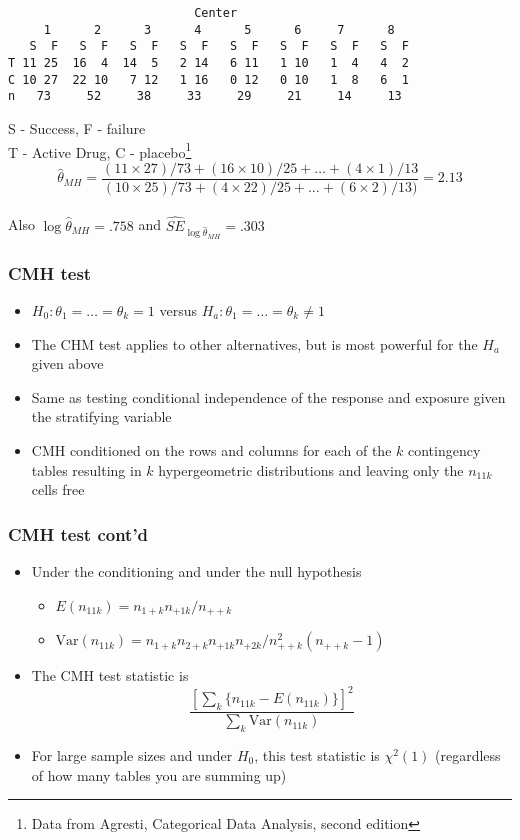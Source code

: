 \documentclass[aspectratio=169]{beamer}
\newcommand{\Var}{\mathrm{Var}}
\begin{document}
\begin{frame}[fragile]
\ttfamily\small
\begin{verbatim}
                          Center
     1      2      3      4      5      6     7      8
   S  F   S  F   S  F   S  F   S  F   S  F   S  F   S  F
T 11 25  16  4  14  5   2 14   6 11   1 10   1  4   4  2
C 10 27  22 10   7 12   1 16   0 12   0 10   1  8   6  1
n   73     52     38     33     29     21     14     13
\end{verbatim}
S - Success, F - failure \\
T - Active Drug,  C - placebo\footnote{Data from Agresti, Categorical Data Analysis, second edition}
\normalfont \\
$$
\hat \theta_{MH} = 
\frac{(11 \times 27) / 73 + (16 \times 10)/25 + \ldots + (4\times 1)/13}
{(10 \times 25) / 73 + (4 \times 22) / 25 + \ldots + (6 \times 2 ) / 13)} = 2.13
$$ \\
Also $\log\hat\theta_{MH} = .758$ and $\hat{SE}_{\log \hat\theta_{MH}} = .303$
\end{frame}

\begin{frame}\frametitle{CMH test}
\begin{itemize}
\item $H_0:\theta_1=\ldots=\theta_k = 1$ versus $H_a:\theta_1=\ldots=\theta_k \neq 1$
\item The CHM test applies to other alternatives, but is most powerful for the
  $H_a$ given above
\item Same as testing conditional independence of the response and exposure given the
  stratifying variable
\item CMH conditioned on the rows and columns for each of the $k$ contingency tables
  resulting in $k$ hypergeometric distributions and leaving only the $n_{11k}$ cells
  free
\end{itemize}
\end{frame}

\begin{frame}\frametitle{CMH test cont'd}
\begin{itemize}
\item Under the conditioning and under the null hypothesis 
  \begin{itemize} 
  \item $E(n_{11k})  = n_{1+k}n_{+1k}/n_{++k}$
  \item $\Var(n_{11k}) = n_{1+k}n_{2+k}n_{+1k}n_{+2k}/n_{++k}^2(n_{++k} - 1)$ 
  \end{itemize}
\item The CMH test statistic is 
  $$
  \frac{[\sum_k \{n_{11k} - E(n_{11k})\}]^2}{\sum_k \Var(n_{11k})}
  $$ 
\item For large sample sizes and under $H_0$, this test statistic is $\chi^2(1)$ (regardless
  of how many tables you are summing up)
\end{itemize}
\end{frame}
\end{document}

